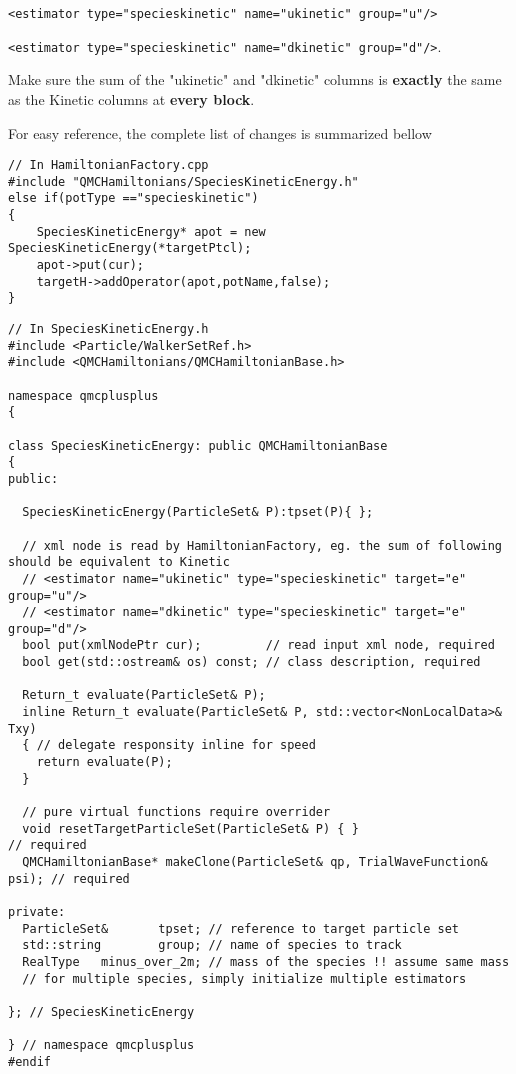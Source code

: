 \verb|<estimator type="specieskinetic" name="ukinetic" group="u"/>|

\verb|<estimator type="specieskinetic" name="dkinetic" group="d"/>|.

Make sure the sum of the "ukinetic" and "dkinetic" columns is \textbf{exactly} the same as the Kinetic columns at \textbf{every block}.

For easy reference, the complete list of changes is summarized bellow
\begin{lstlisting}[style=C++]
// In HamiltonianFactory.cpp
#include "QMCHamiltonians/SpeciesKineticEnergy.h"
else if(potType =="specieskinetic")
{
	SpeciesKineticEnergy* apot = new SpeciesKineticEnergy(*targetPtcl);
	apot->put(cur);
	targetH->addOperator(apot,potName,false);
}
\end{lstlisting}
\begin{lstlisting}[style=C++]
// In SpeciesKineticEnergy.h
#include <Particle/WalkerSetRef.h>
#include <QMCHamiltonians/QMCHamiltonianBase.h>

namespace qmcplusplus
{

class SpeciesKineticEnergy: public QMCHamiltonianBase
{
public:

  SpeciesKineticEnergy(ParticleSet& P):tpset(P){ };

  // xml node is read by HamiltonianFactory, eg. the sum of following should be equivalent to Kinetic
  // <estimator name="ukinetic" type="specieskinetic" target="e" group="u"/>
  // <estimator name="dkinetic" type="specieskinetic" target="e" group="d"/>
  bool put(xmlNodePtr cur);         // read input xml node, required
  bool get(std::ostream& os) const; // class description, required
  
  Return_t evaluate(ParticleSet& P);
  inline Return_t evaluate(ParticleSet& P, std::vector<NonLocalData>& Txy)
  { // delegate responsity inline for speed
    return evaluate(P);
  } 
  
  // pure virtual functions require overrider
  void resetTargetParticleSet(ParticleSet& P) { }                         // required
  QMCHamiltonianBase* makeClone(ParticleSet& qp, TrialWaveFunction& psi); // required
  
private:
  ParticleSet&       tpset; // reference to target particle set
  std::string        group; // name of species to track
  RealType   minus_over_2m; // mass of the species !! assume same mass
  // for multiple species, simply initialize multiple estimators
  
}; // SpeciesKineticEnergy

} // namespace qmcplusplus
#endif
\end{lstlisting}
